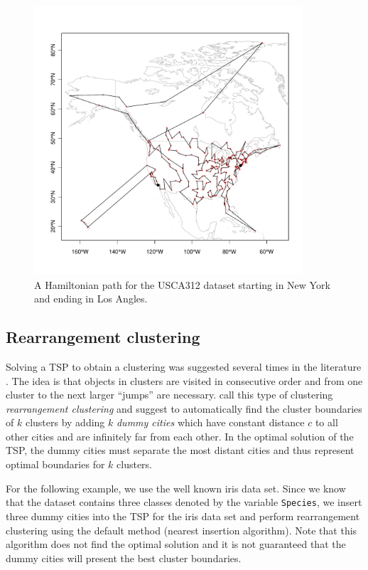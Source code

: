 \documentclass[10pt,a4paper,fleqn]{article}
\newcommand{\code}[1]{\mbox{\texttt{#1}}}
\begin{document}
\begin{figure}
\centering
\includegraphics[width=10cm, trim=0 30 0 0]{TSP-map3}
\caption{A Hamiltonian path for the USCA312 dataset starting in New York
  and ending in Los Angles.}
\label{fig:map3}
\end{figure}


\subsection{Rearrangement clustering}
Solving a TSP to obtain a clustering was suggested several times in the
literature \citep[see, e.g.,][]{Lenstra1974, Alpert1997, Johnson2004}.  The idea
is that objects in clusters are visited in consecutive order and from one
cluster to the next larger ``jumps'' are necessary.  \cite{Climer2006} call
this type of clustering \emph{rearrangement clustering} and suggest to
automatically find the cluster boundaries of $k$ clusters by adding $k$
\emph{dummy cities} which have constant distance $c$ to all other cities and
are infinitely far from each other. In the optimal
solution of the TSP, the dummy cities must separate the most distant cities and
thus represent optimal boundaries for $k$ clusters.

For the following example, we use the well known iris data set. Since we
know that the dataset contains three classes denoted by the variable
\code{Species}, we insert three dummy cities into the TSP for the iris
data set and perform rearrangement clustering using the default method
(nearest insertion algorithm).  Note that this algorithm does not find
the optimal solution and it is not guaranteed that the dummy cities will
present the best cluster boundaries.
\end{document}
